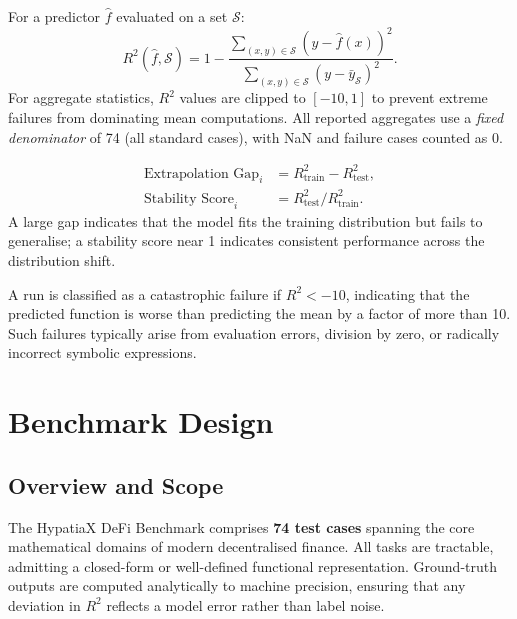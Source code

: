 \documentclass[twoside,11pt]{article}
\newcommand{\Rsq}{R^{2}}
\newcommand{\Rtrain}{R^{2}_{\mathrm{train}}}
\newcommand{\Rtest}{R^{2}_{\mathrm{test}}}
\begin{document}
\begin{definition}
For a predictor $\hat{f}$ evaluated on a set $\mathcal{S}$:
\begin{equation}
  \Rsq(\hat{f}, \mathcal{S}) = 1 - \frac{\sum_{(x,y)\in\mathcal{S}}(y - \hat{f}(x))^2}
                                         {\sum_{(x,y)\in\mathcal{S}}(y - \bar{y}_{\mathcal{S}})^2}.
  \label{eq:r2}
\end{equation}
For aggregate statistics, $\Rsq$ values are clipped to $[-10, 1]$ to prevent
extreme failures from dominating mean computations.  All reported aggregates use a
\emph{fixed denominator} of 74 (all standard cases), with NaN and failure cases
counted as 0.
\end{definition}

\begin{definition}
\begin{align}
  \text{Extrapolation Gap}_i &= \Rtrain - \Rtest, \label{eq:gap}\\
  \text{Stability Score}_i   &= \Rtest / \Rtrain. \label{eq:stability}
\end{align}
A large gap indicates that the model fits the training distribution but fails
to generalise; a stability score near 1 indicates consistent performance across
the distribution shift.
\end{definition}

\begin{definition}
A run is classified as a catastrophic failure if $\Rsq < -10$, indicating that
the predicted function is worse than predicting the mean by a factor of more
than 10.  Such failures typically arise from evaluation errors, division by
zero, or radically incorrect symbolic expressions.
\end{definition}

\section{Benchmark Design}
\label{sec:benchmark}

\subsection{Overview and Scope}\label{subsec:overview-and-scope}
\label{sec:bench_overview}

The HypatiaX DeFi Benchmark comprises \textbf{74 test cases} spanning the core
mathematical domains of modern decentralised finance.  All tasks are tractable,
admitting a closed-form or well-defined functional representation.  Ground-truth
outputs are computed analytically to machine precision, ensuring that any
deviation in $\Rsq$ reflects a model error rather than label noise.
\end{document}
